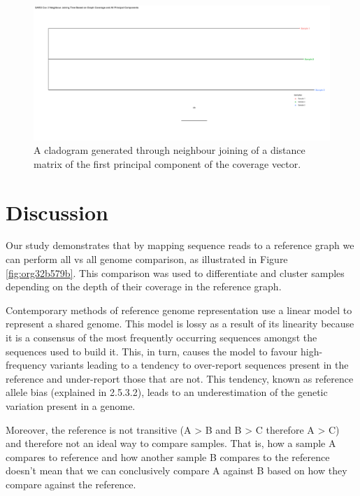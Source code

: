 \documentclass[10pt, a4paper]{article}
\begin{document}
\begin{landscape}
\begin{figure}
\centering
\includegraphics[width=.9\linewidth]{../Figures/SARS_CoV_2/SARS_CoV_2_all_principal_components_nj_tree.png}
\caption[SARS-CoV-2 PC1 to PC5 cladogram]{\label{fig:orga7d99cb}
A cladogram generated through neighbour joining  of a distance matrix of the first principal component of the coverage vector.}
\end{figure}
\end{landscape}
\newpage
\section{Discussion}
\label{sec:org37f5992}
Our study demonstrates that by mapping sequence reads to a reference
graph we can perform all vs all genome comparison, as illustrated in 
Figure \ref{fig:org32b579b}.
This comparison was used to differentiate and cluster samples depending on the
depth of their coverage in the reference graph.


Contemporary methods of reference genome representation use a linear model to
represent a shared genome. This model is lossy as a result of its linearity
because it is a consensus of the most frequently occurring sequences amongst 
the sequences used to build it. This, in turn, causes the model to favour 
high-frequency variants leading to a tendency to over-report sequences present 
in the reference and under-report those that are not. This tendency, known as
reference allele bias (explained in 2.5.3.2), leads to an underestimation of 
the genetic variation present in a genome. 

Moreover, the reference is not transitive  (A > B and B > C therefore A > C) 
and therefore not an ideal way to compare samples.
That is, how a sample A compares to reference and how another sample B compares
to the reference doesn't mean that we can conclusively compare A against B based
on how they compare against the reference.
\end{document}
